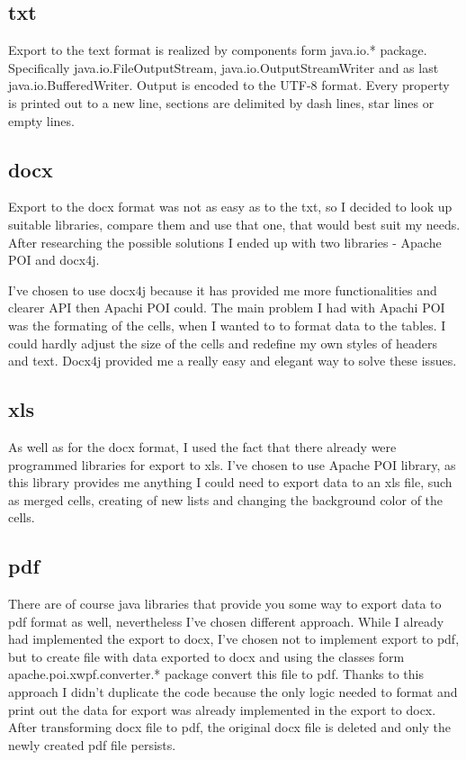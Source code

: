 \documentclass[thesis=B,english]{FITthesis}[2012/10/20]
\begin{document}
\subsection{txt}
Export to the text format is realized by components form java.io.* package. Specifically java.io.FileOutputStream, java.io.OutputStreamWriter and as last java.io.BufferedWriter. Output is encoded to the UTF-8 format. Every property is printed out to a new line, sections are delimited by dash lines, star lines or empty lines.
\subsection{docx}
Export to the docx format was not as easy as to the txt, so I decided to look up suitable libraries, compare them and use that one, that would best suit my needs. After researching the possible solutions I ended up with two libraries - Apache POI and docx4j.

I've chosen to use docx4j because it has provided me more functionalities and clearer API then Apachi POI could. The main problem I had with Apachi POI was the formating of the cells, when I wanted to to format data to the tables. I could hardly adjust the size of the cells and redefine my own styles of headers and text. Docx4j provided me a really easy and elegant way to solve these issues.
\subsection{xls}
As well as for the docx format, I used the fact that there already were programmed libraries for export to xls.
I've chosen to use Apache POI library, as this library provides me anything I could need to export data to an xls file, such as merged cells, creating of new lists and changing the background color of the cells.
\subsection{pdf}
There are of course java libraries that provide you some way to export data to pdf format as well, nevertheless I've chosen different approach. While I already had implemented the export to docx, I've chosen not to implement export to pdf, but to create file with data exported to docx and using the classes form apache.poi.xwpf.converter.* package convert this file to pdf. Thanks to this approach I didn't duplicate the code because the only logic needed to format and print out the data for export was already implemented in the export to docx. After transforming docx file to pdf, the original docx file is deleted and only the newly created pdf file persists.
\end{document}
